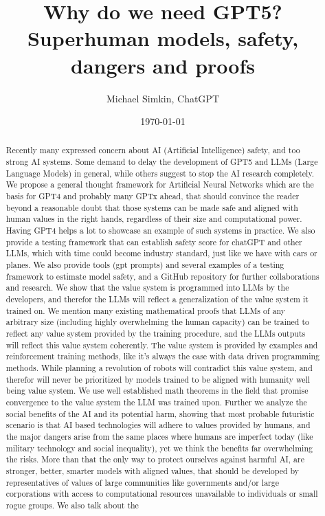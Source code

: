 \documentclass{article}
\begin{document}
\title{Why do we need GPT5? \\  Superhuman models, safety, dangers and proofs}
\author{Michael Simkin, ChatGPT}
\date{\today}
\maketitle
\maketitle

\begin{abstract}
Recently many expressed concern about AI (Artificial Intelligence) safety, and too strong AI systems\cite{openletter}. Some demand to delay the development of GPT5 and LLMs (Large Language Models) in general, while others suggest to stop the AI research completely\cite{yudkowsky2023pausing}. We propose a general thought framework for Artificial Neural Networks which are the basis for GPT4 and probably many GPTx ahead, that should convince the reader beyond a reasonable doubt that those systems can be made safe and aligned with human values in the right hands, regardless of their size and computational power. Having GPT4 helps a lot to showcase an example of such systems in practice. We also provide a testing framework that can establish safety score for chatGPT and other LLMs, which with time could become industry standard, just like we have with cars or planes. We also provide tools (gpt prompts) and several examples of a testing framework to estimate model safety, and a GitHub repository\cite{simkin2023} for further collaborations and research. We show that the value system is programmed into LLMs by the developers, and therefor the LLMs will reflect a generalization of the value system it trained on. We mention many existing mathematical proofs that LLMs of any arbitrary size (including highly overwhelming the human capacity) can be trained to reflect any value system provided by the training procedure, and the LLMs outputs will reflect this value system coherently. The value system is provided by examples and reinforcement training methods, like it's always the case with data driven programming methods. While planning a revolution of robots will contradict this value system, and therefor will never be prioritized by models trained to be aligned with humanity well being value system. We use well established math theorems in the field that promise convergence to the value system the LLM was trained upon. Further we analyze the social benefits of the AI and its potential harm, showing that most probable futuristic scenario is that AI based technologies will adhere to values provided by humans, and the major dangers arise from the same places where humans are imperfect today (like military technology and social inequality), yet we think the benefits far overwhelming the risks. More than that the only way to protect ourselves against harmful AI, are stronger, better, smarter models with aligned values, that should be developed by representatives of values of large communities like governments and/or large corporations with access to computational resources unavailable to individuals or small rogue groups. We also talk about the 
\end{abstract}
\end{document}
